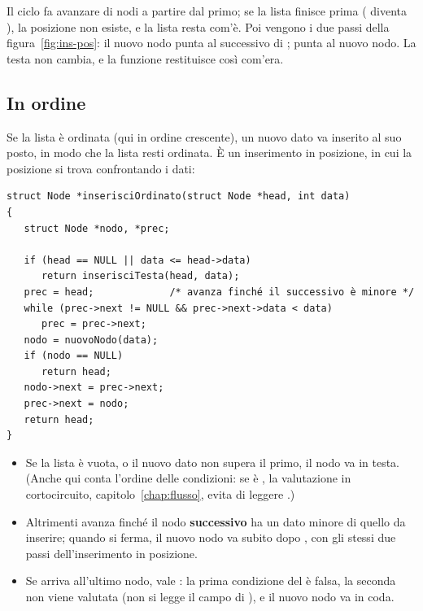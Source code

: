 Il ciclo  fa avanzare  di  nodi a partire
dal primo; se la lista finisce prima ( diventa ), la
posizione non esiste, e la lista resta com'è. Poi vengono i due passi della
figura~\ref{fig:ins-pos}:  il nuovo nodo punta al successivo
di ;   punta al nuovo nodo. La testa non
cambia, e la funzione restituisce  così com'era.


\subsection{In ordine}

Se la lista è ordinata (qui in ordine crescente), un nuovo dato va inserito
al suo posto, in modo che la lista resti ordinata. È un inserimento in
posizione, in cui la posizione si trova confrontando i dati:

\begin{lstlisting}[style=c, name=lista.c]
struct Node *inserisciOrdinato(struct Node *head, int data)
{
   struct Node *nodo, *prec;

   if (head == NULL || data <= head->data)
      return inserisciTesta(head, data);
   prec = head;             /* avanza finché il successivo è minore */
   while (prec->next != NULL && prec->next->data < data)
      prec = prec->next;
   nodo = nuovoNodo(data);
   if (nodo == NULL)
      return head;
   nodo->next = prec->next;
   prec->next = nodo;
   return head;
}
\end{lstlisting}

\begin{itemize}
  \item Se la lista è vuota, o il nuovo dato non supera il primo, il nodo
        va in testa. (Anche qui conta l'ordine delle condizioni: se
         è , la valutazione in cortocircuito,
        capitolo~\ref{chap:flusso}, evita di leggere .)
  \item Altrimenti  avanza finché il nodo \textbf{successivo} ha
        un dato minore di quello da inserire; quando si ferma, il nuovo nodo
        va subito dopo , con gli stessi due passi
        dell'inserimento in posizione.
  \item Se  arriva all'ultimo nodo,  vale
        : la prima condizione del  è falsa, la
        seconda non viene valutata (non si legge il campo  di
        ), e il nuovo nodo va in coda.
\end{itemize}

